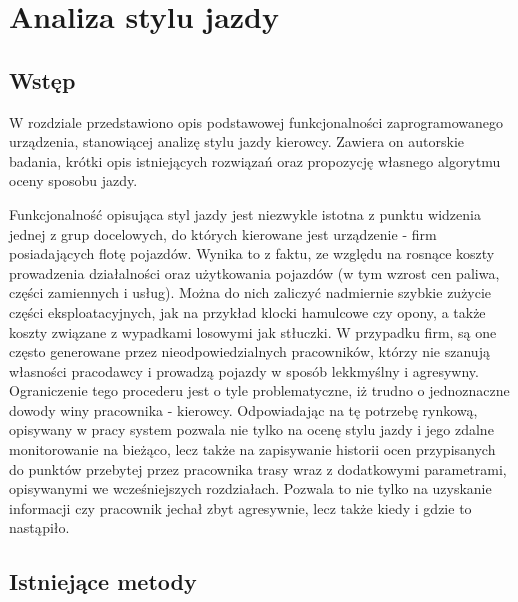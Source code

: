 \chapter{Analiza stylu jazdy}

\section{Wstęp}

W rozdziale przedstawiono opis podstawowej funkcjonalności zaprogramowanego urządzenia, stanowiącej analizę stylu jazdy kierowcy. Zawiera on autorskie badania, krótki opis istniejących rozwiązań oraz propozycję własnego algorytmu oceny sposobu jazdy. 

Funkcjonalność opisująca styl jazdy jest niezwykle istotna z punktu widzenia jednej z grup docelowych, do których kierowane jest urządzenie - firm posiadających flotę pojazdów. Wynika to z faktu, ze względu na rosnące koszty prowadzenia działalności oraz użytkowania pojazdów (w tym wzrost cen paliwa, części zamiennych i usług). Można do nich zaliczyć nadmiernie szybkie zużycie części eksploatacyjnych, jak na przykład klocki hamulcowe czy opony, a także koszty związane z wypadkami losowymi jak stłuczki. W przypadku firm, są one często generowane przez nieodpowiedzialnych pracowników, którzy nie szanują własności pracodawcy i prowadzą pojazdy w sposób lekkmyślny i agresywny. Ograniczenie tego procederu jest o tyle problematyczne, iż trudno o jednoznaczne dowody winy pracownika - kierowcy. Odpowiadając na tę potrzebę rynkową, opisywany w pracy system pozwala nie tylko na ocenę stylu jazdy i jego zdalne monitorowanie na bieżąco, lecz także na zapisywanie historii ocen przypisanych do punktów przebytej przez pracownika trasy wraz z dodatkowymi parametrami, opisywanymi we wcześniejszych rozdziałach. Pozwala to nie tylko na uzyskanie informacji czy pracownik jechał zbyt agresywnie, lecz także kiedy i gdzie to nastąpiło.

\section{Istniejące metody}


